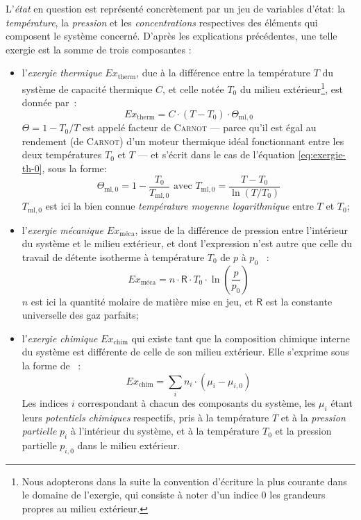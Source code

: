 \documentclass[a4paper,11pt]{scrartcl}
\begin{document}
L'\emph{état} en question est représenté concrètement par un jeu de variables
d'état: la \emph{température}, la \emph{pression} et les \emph{concentrations}
respectives des éléments qui composent le système concerné. D'après les
explications précédentes, une telle exergie est la somme de trois composantes :
\begin{itemize}
	\item l'\emph{exergie thermique} $Ex_{\text{therm}}$, due à la
		différence entre la température $T$ du système de capacité
		thermique $C$, et celle notée $T_0$ du milieu
		extérieur\footnote{Nous adopterons dans la suite la
		convention d'écriture la plus courante dans le domaine de
		l'exergie, qui consiste à noter d'un indice $0$ les grandeurs
		propres au milieu extérieur.}, est donnée
		par~\cite{entropie-157-0013-0020}: \begin{equation}
			Ex_{\text{therm}} = C \cdot (T-T_0) \cdot
			\Theta_{\text{ml},0} \label{eq:exergie-th-0}
		\end{equation} $\Theta=1-T_0/T$ est appelé facteur de
		\textsc{Carnot} --- parce qu'il est égal au rendement (de
		\textsc{Carnot}) d'un moteur thermique idéal fonctionnant entre
		les deux températures $T_0$ et $T$ --- et s'écrit dans le cas de
		l'équation \eqref{eq:exergie-th-0}, sous la forme:
		\begin{equation}
			\Theta_{\text{ml},0} = 1 - \frac{T_0}{T_{\text{ml},0}}
			\text{ avec } T_{\text{ml},0} =
			\frac{T-T_0}{\ln(T/T_0)}
		\end{equation} $T_{\text{ml},0}$ est ici la bien connue
		\emph{température moyenne logarithmique} entre $T$ et $T_0$;
	\item l'\emph{exergie mécanique} $Ex_{\text{méca}}$, issue de la
		différence de pression entre l'intérieur du système et le milieu
		extérieur, et dont l'expression n'est autre que celle du travail
		de détente isotherme à température $T_0$ de $p$ à
		$p_0$~\cite{TI-BE8013} : \begin{equation}
			Ex_{\text{méca}} = n \cdot \textsf{R} \cdot T_0 \cdot
			\ln\left( \frac{p}{p_0} \right) \label{eq:exergie-m-0}
		\end{equation} $n$ est ici la quantité molaire de matière mise
		en jeu, et $\mathsf{R}$ est la constante universelle des gaz
		parfaits;
	\item l'\emph{exergie chimique} $Ex_{\text{chim}}$ qui existe tant que
		la composition chimique interne du système est différente de
		celle de son milieu extérieur. Elle s'exprime sous la forme
		de~\cite{TI-BE8015} : \begin{equation}
			Ex_{\text{chim}} = \sum_i n_i \cdot (\mu_i - \mu_{i,0})
		\end{equation} Les indices $i$ correspondant à chacun des
		composants du système, les $\mu_i$ étant leurs \emph{potentiels
		chimiques} respectifs, pris à la température $T$ et à la
		\emph{pression partielle} $p_i$ à l'intérieur du système, et à
		la température $T_0$ et la pression partielle $p_{i,0}$ dans le
		milieu extérieur.
\end{itemize}
\end{document}
